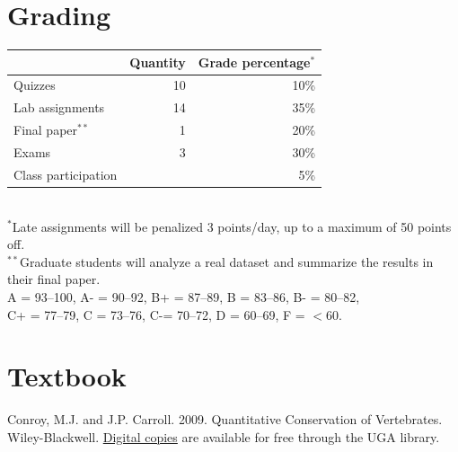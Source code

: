 \documentclass[12pt]{article}
\begin{document}
\section*{\normalsize Grading}
\vspace{-4mm}
\begin{center}
  \small
  \begin{tabular}[h!]{lrr}
    \hline
                        & Quantity & Grade percentage$^*$                                           \\
    \hline
    Quizzes             & 10       & 10\%                                                           \\
    Lab assignments     & 14       & 35\%                                                           \\
    Final paper$^{**}$  & 1        & 20\%                                                           \\
    Exams               & 3        & 30\%                                                           \\
    Class participation &          & 5\%                                                            \\
    \hline
  \end{tabular}                                                                                     \\
  \small
\hspace{0mm} $^*$Late assignments will be penalized 3 points/day, up to a maximum of 50 points off. \\ 
\hspace{0mm} $^{**}$Graduate students will analyze a real dataset and
summarize the results in their final paper. \\
{%
A = 93--100, A- = 90--92, B+ = 87--89, B = 83--86,
B- = 80--82, \\ C+ = 77--79, C = 73--76, C-= 70--72, D = 60--69, F = $<$60. 
}
\end{center}

\newpage


\section*{\normalsize Textbook}
\vspace{-4mm}
Conroy, M.J. and J.P. Carroll. 2009. Quantitative Conservation of
Vertebrates. Wiley-Blackwell. \href{http://preproxy.galib.uga.edu/login?url=http://onlinelibrary.wiley.com/book/10.1002/9781444303155}{Digital
  copies} are available for free through the UGA library. 
\end{document}

